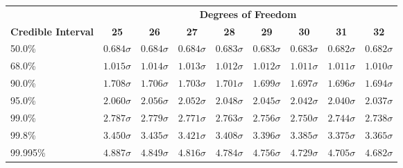 \begin{center}
\begin{tabular}{p{0.75in}cccccccc}
 & \multicolumn{8}{c}{\bf Degrees of Freedom} \\
{\bf Credible Interval} & {\bf 25} & {\bf 26} & {\bf 27} & {\bf 28} & {\bf 29} & {\bf 30} & {\bf 31} & {\bf 32}\\
50.0\%& $ 0.684 \sigma$& $ 0.684 \sigma$& $ 0.684 \sigma$& $ 0.683 \sigma$& $ 0.683 \sigma$& $ 0.683 \sigma$& $ 0.682 \sigma$& $ 0.682 \sigma$\\
68.0\%& $ 1.015 \sigma$& $ 1.014 \sigma$& $ 1.013 \sigma$& $ 1.012 \sigma$& $ 1.012 \sigma$& $ 1.011 \sigma$& $ 1.011 \sigma$& $ 1.010 \sigma$\\
90.0\%& $ 1.708 \sigma$& $ 1.706 \sigma$& $ 1.703 \sigma$& $ 1.701 \sigma$& $ 1.699 \sigma$& $ 1.697 \sigma$& $ 1.696 \sigma$& $ 1.694 \sigma$\\
95.0\%& $ 2.060 \sigma$& $ 2.056 \sigma$& $ 2.052 \sigma$& $ 2.048 \sigma$& $ 2.045 \sigma$& $ 2.042 \sigma$& $ 2.040 \sigma$& $ 2.037 \sigma$\\
99.0\%& $ 2.787 \sigma$& $ 2.779 \sigma$& $ 2.771 \sigma$& $ 2.763 \sigma$& $ 2.756 \sigma$& $ 2.750 \sigma$& $ 2.744 \sigma$& $ 2.738 \sigma$\\
99.8\%& $ 3.450 \sigma$& $ 3.435 \sigma$& $ 3.421 \sigma$& $ 3.408 \sigma$& $ 3.396 \sigma$& $ 3.385 \sigma$& $ 3.375 \sigma$& $ 3.365 \sigma$\\
99.995\%& $ 4.887 \sigma$& $ 4.849 \sigma$& $ 4.816 \sigma$& $ 4.784 \sigma$& $ 4.756 \sigma$& $ 4.729 \sigma$& $ 4.705 \sigma$& $ 4.682 \sigma$\\
\end{tabular}
\end{center}
